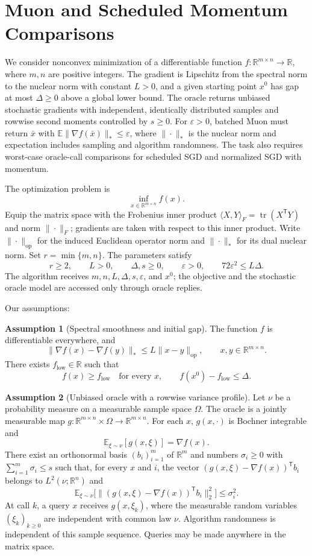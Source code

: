 \documentclass[10pt]{article}
\theoremstyle{definition}
\newtheorem{assumption}{Assumption}
\begin{document}
\section*{Muon and Scheduled Momentum Comparisons}
We consider nonconvex minimization of a differentiable function $f:\mathbb{R}^{m\times n}\to\mathbb{R}$, where $m,n$ are positive integers. The gradient is Lipschitz from the spectral norm to the nuclear norm with constant $L>0$, and a given starting point $x^0$ has gap at most $\Delta\geq0$ above a global lower bound. The oracle returns unbiased stochastic gradients with independent, identically distributed samples and rowwise second moments controlled by $s\geq0$. For $\varepsilon>0$, batched Muon must return $\bar{x}$ with $\mathbb{E}\|\nabla f(\bar{x})\|_*\leq\varepsilon$, where $\|\cdot\|_*$ is the nuclear norm and expectation includes sampling and algorithm randomness. The task also requires worst-case oracle-call comparisons for scheduled SGD and normalized SGD with momentum.

The optimization problem is
\[
\inf_{x\in\mathbb{R}^{m\times n}} f(x).
\]
Equip the matrix space with the Frobenius inner product $\langle X,Y\rangle_F=\operatorname{tr}(X^{\mathsf T}Y)$ and norm $\|\cdot\|_F$; gradients are taken with respect to this inner product. Write $\|\cdot\|_{\mathrm{op}}$ for the induced Euclidean operator norm and $\|\cdot\|_*$ for its dual nuclear norm. Set $r=\min\{m,n\}$. The parameters satisfy
\[
r\geq2,\qquad L>0,\qquad \Delta,s\geq0,\qquad
\varepsilon>0,\qquad 72\varepsilon^2\leq L\Delta.
\]
The algorithm receives $m,n,L,\Delta,s,\varepsilon$, and $x^0$; the objective and the stochastic oracle model are accessed only through oracle replies.

Our assumptions:
\begin{assumption}[Spectral smoothness and initial gap]
The function $f$ is differentiable everywhere, and
\[
\|\nabla f(x)-\nabla f(y)\|_*
\leq L\|x-y\|_{\mathrm{op}},
\qquad x,y\in\mathbb{R}^{m\times n}.
\]
There exists $f_{\mathrm{low}}\in\mathbb{R}$ such that
\[
f(x)\geq f_{\mathrm{low}}\quad\text{for every }x,
\qquad f(x^0)-f_{\mathrm{low}}\leq\Delta.
\]
\end{assumption}

\begin{assumption}[Unbiased oracle with a rowwise variance profile]
Let $\nu$ be a probability measure on a measurable sample space $\Omega$. The oracle is a jointly measurable map
$g:\mathbb{R}^{m\times n}\times\Omega\to\mathbb{R}^{m\times n}$.
For each $x$, $g(x,\cdot)$ is Bochner integrable and
\[
\mathbb{E}_{\xi\sim\nu}[g(x,\xi)]=\nabla f(x).
\]
There exist an orthonormal basis $(b_i)_{i=1}^m$ of $\mathbb{R}^m$ and numbers $\sigma_i\geq0$ with $\sum_{i=1}^m\sigma_i\leq s$ such that, for every $x$ and $i$, the vector
$(g(x,\xi)-\nabla f(x))^{\mathsf T}b_i$ belongs to $L^2(\nu;\mathbb{R}^n)$ and
\[
\mathbb{E}_{\xi\sim\nu}
\bigl[\|(g(x,\xi)-\nabla f(x))^{\mathsf T}b_i\|_2^2\bigr]
\leq\sigma_i^2.
\]
At call $k$, a query $x$ receives $g(x,\xi_k)$, where the measurable random variables $(\xi_k)_{k\geq0}$ are independent with common law $\nu$. Algorithm randomness is independent of this sample sequence. Queries may be made anywhere in the matrix space.
\end{assumption}
\end{document}
